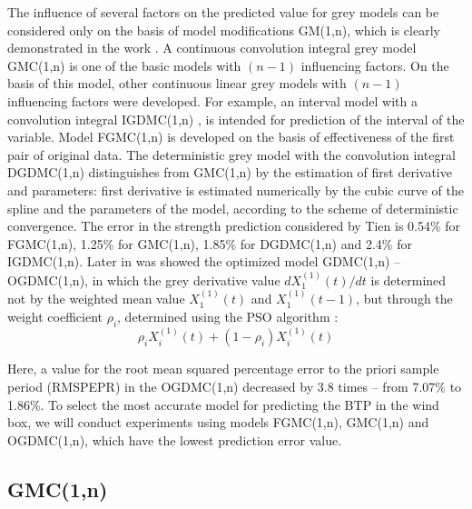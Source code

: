 \documentclass[AMS,STIX2COL]{WileyNJD-v2}
\begin{document}
The influence of several factors on the predicted value for grey models can be considered only on the basis of model modifications GM(1,n), which is clearly demonstrated in the work \cite{Tien2008}. A continuous convolution integral grey model GMC(1,n) \cite{Kaymak2017} is one of the basic models with $(n-1)$ influencing factors. On the basis of this model, other continuous linear grey models with $(n-1)$ influencing factors were developed. For example, an interval model with a convolution integral IGDMC(1,n) \cite{Tien2008}, is intended for prediction of the interval of the variable. Model FGMC(1,n) \cite{Tien2011}  is developed on the basis of effectiveness of the first pair of original data. The deterministic grey model with the convolution integral DGDMC(1,n) \cite{Tien2009} distinguishes from GMC(1,n) by the estimation of first derivative and parameters: first derivative is estimated numerically by the cubic curve of the spline and the parameters of the model, according to the scheme of deterministic convergence. The error in the strength prediction considered by Tien is 0.54\% for FGMC(1,n), 1.25\% for GMC(1,n), 1.85\% for DGDMC(1,n) and 2.4\% for IGDMC(1,n). Later in \cite{Wang2014} was showed the optimized model GDMC(1,n) \cite{Tien2011} – OGDMC(1,n), in which the grey derivative value $dX_1^{(1)}(t)/dt$ is determined not by the weighted mean value $X_1^{(1)}(t)$ and $X_1^{(1)}(t-1)$,  but through the weight coefficient $\rho_i$, determined using the PSO algorithm \cite{Kennedy1995}:
\begin{equation}
\rho_iX_i^{(1)}(t)+(1-\rho_i)X_i^{(1)}(t)
\end{equation} 

Here, a value for the root mean squared percentage error to the priori sample period (RMSPEPR) in the OGDMC(1,n) decreased by 3.8 times – from 7.07\% to 1.86\%.
To select the most accurate model for predicting the BTP in the wind box, we will conduct experiments using models FGMC(1,n), GMC(1,n) and OGDMC(1,n), which have the lowest prediction error value.

\subsection{GMC(1,n)}
\end{document}
